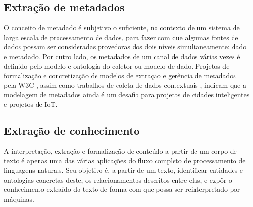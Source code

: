\subsection{Extração de metadados}

O conceito de metadado é subjetivo o suficiente, no contexto de um sistema de larga escala de processamento de dados, para fazer com que algumas fontes de dados possam ser consideradas provedoras dos dois níveis simultaneamente: dado e metadado. Por outro lado, os metadados de um canal de dados várias vezes é definido pelo modelo e ontologia do coletor ou modelo de dado. Projetos de formalização e concretização de modelos de extração e gerência de metadados pela W3C \cite{w3c:ssn}, assim como trabalhos de coleta de dados contextuais \cite{contextualdata:smartcities}, indicam que a modelagem de metadados ainda é um desafio para projetos de cidades inteligentes e projetos de IoT.

\subsection{Extração de conhecimento}

A interpretação, extração e formalização de conteúdo a partir de um corpo de texto é apenas uma das várias aplicações do fluxo completo de processamento de linguagens naturais. Seu objetivo é, a partir de um texto, identificar entidades e ontologias concretas deste, os relacionamentos descritos entre elas, e expôr o conhecimento extraído do texto de forma com que possa ser reinterpretado por máquinas.
